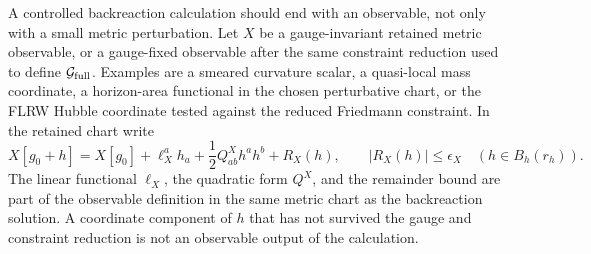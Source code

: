 \begin{controlledapproximation}
\label{ca:semiclassical-retained-metric-observable-output}
A controlled backreaction calculation should end with an observable, not only
with a small metric perturbation.  Let \(X\) be a gauge-invariant retained
metric observable, or a gauge-fixed observable after the same constraint
reduction used to define \(\mathcal G_{\rm full}\).  Examples are a smeared
curvature scalar, a quasi-local mass coordinate, a horizon-area functional in
the chosen perturbative chart, or the FLRW Hubble coordinate tested against
the reduced Friedmann constraint.  In the retained chart write
\begin{equation}
  X[g_0+h]
  =
  X[g_0]
  +
  \ell_X^a h_a
  +
  \frac12 Q^X_{ab}h^a h^b
  +
  R_X(h),
  \qquad
  |R_X(h)|\le\epsilon_X
  \quad(h\in B_h(r_h)).
  \label{eq:semiclassical-observable-chart}
\end{equation}
The linear functional \(\ell_X\), the quadratic form \(Q^X\), and the
remainder bound are part of the observable definition in the same metric
chart as the backreaction solution.  A coordinate component of \(h\) that has
not survived the gauge and constraint reduction is not an observable output of
the calculation.


\end{controlledapproximation}

